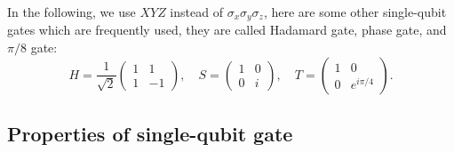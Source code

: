 \documentclass[a4paper,10pt]{book}
\numberwithin{equation}{section}
\begin{document}
In the following, we use $XYZ$ instead of $\sigma_x\sigma_y\sigma_z$, here are some other single-qubit gates which are frequently used, they are called Hadamard gate, phase gate, and $\pi/8$ gate:
\begin{equation}
    H = \frac{1}{\sqrt{2}}\begin{pmatrix} 1 & 1 \\ 1 & -1 \end{pmatrix}, \quad
    S = \begin{pmatrix} 1 & 0 \\ 0 & i \end{pmatrix}, \quad
    T = \begin{pmatrix} 1 & 0 \\ 0 & e^{i\pi/4} \end{pmatrix}.
\end{equation}



\subsection{Properties of single-qubit gate}
\end{document}
